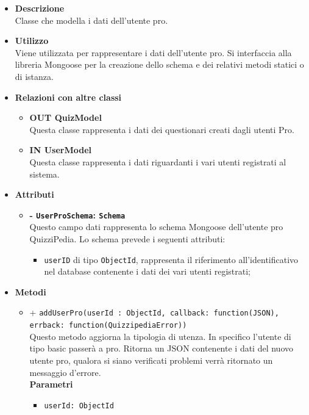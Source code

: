 \begin{itemize}
	\item \textbf{Descrizione} \\
	Classe che modella i dati dell'utente pro.
	\item \textbf{Utilizzo} \\
	Viene utilizzata per rappresentare i dati dell'utente pro. Si interfaccia alla libreria Mongoose per la creazione dello schema e dei relativi metodi statici o di istanza.
	\item \textbf{Relazioni con altre classi} 
		\begin{itemize}
			\item \textbf{OUT QuizModel} \\
			Questa classe rappresenta i dati dei questionari creati dagli utenti Pro.
			\item \textbf{IN UserModel} \\
			Questa classe rappresenta i dati riguardanti i vari utenti registrati al sistema.
		\end{itemize}
	\item \textbf{Attributi} 
		\begin{itemize}
			\item \textbf{- \texttt{UserProSchema}: \texttt{Schema}} \\
			Questo campo dati rappresenta lo schema Mongoose dell'utente pro QuizziPedia. Lo schema prevede i seguenti attributi:
			\begin{itemize}
				\item 
					\texttt{userID} di tipo \texttt{ObjectId}, rappresenta il riferimento all'identificativo nel database contenente i dati dei vari utenti registrati;
			\end{itemize}		
		\end{itemize}	
	\item \textbf{Metodi}
		\begin{itemize}
		\item
		+ \texttt{addUserPro(userId : ObjectId, callback: function(JSON), errback: function(QuizzipediaError))} \\	
		Questo metodo aggiorna la tipologia di utenza. In specifico l'utente di tipo basic passerà a pro. Ritorna un JSON contenente i dati del nuovo utente pro, qualora si siano verificati problemi verrà ritornato un messaggio d'errore.	\\	
		\textbf{Parametri} 
			\begin{itemize}
			\item
				\texttt{userId: ObjectId} \\

\end{itemize}
\end{itemize}
\end{itemize}
